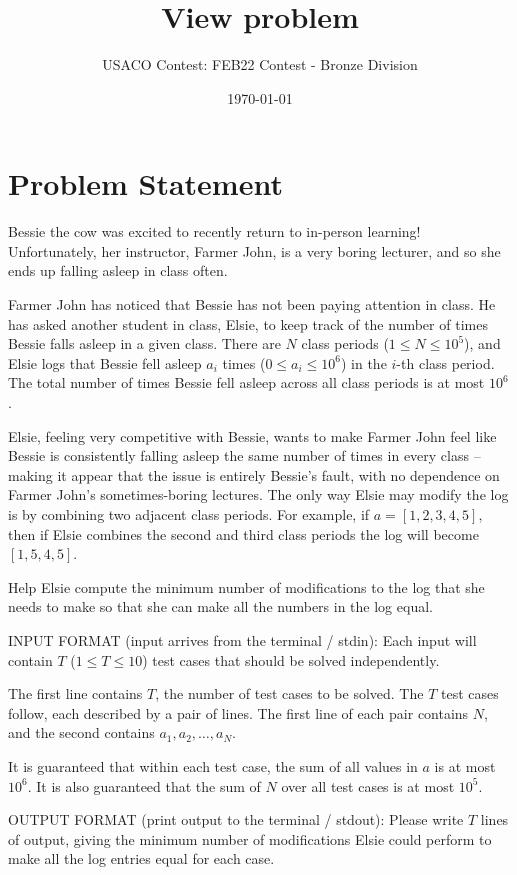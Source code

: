 \documentclass[12pt]{article}
\title{View problem}
\author{USACO Contest: FEB22 Contest - Bronze Division}
\date{\today}
\begin{document}
\maketitle

\section*{Problem Statement}

Bessie the cow was excited to recently return to in-person learning!
Unfortunately, her instructor, Farmer John, is a very boring lecturer, and so
she ends up falling asleep in class often.

Farmer John has noticed that Bessie has not been paying attention in class. He
has asked another student in class, Elsie, to keep track of the number of times
Bessie falls asleep in a given class. There are $N$ class periods
($1\le N\le 10^5$), and Elsie logs that Bessie fell asleep $a_i$ times
($0\le a_i\le 10^6$) in the $i$-th class period. The total number of times Bessie fell
asleep across all class periods is at most $10^6$.

Elsie, feeling very competitive with Bessie, wants to make Farmer John feel like
Bessie is consistently falling asleep the same number of times in every class --
making it appear that the issue is entirely Bessie's fault, with no dependence
on Farmer John's sometimes-boring lectures. The only way Elsie may modify the
log is by combining two adjacent class periods.  For example, if
$a=[1,2,3,4,5],$ then if Elsie combines the second and third class periods the
log will become $[1,5,4,5]$.

Help Elsie compute the minimum number of modifications to the log that she needs
to make so that she can make all the numbers in the log equal.

INPUT FORMAT (input arrives from the terminal / stdin):
Each input will contain $T$ ($1\le T\le 10$) test cases that should be solved
independently.

The first line contains $T$, the number of test cases to be solved. The $T$ test
cases follow, each described by a pair of lines. The first line of each pair
contains $N$, and the second contains $a_1,a_2,\ldots,a_N$. 

It is guaranteed that within each test case, the sum of all values in $a$ is at
most $10^6$. It is also guaranteed that the sum of $N$ over all test cases is at
most
$10^5$.


OUTPUT FORMAT (print output to the terminal / stdout):
Please write $T$ lines of output, giving the minimum number of modifications
Elsie could perform to make all the log entries equal for each case.
\end{document}
